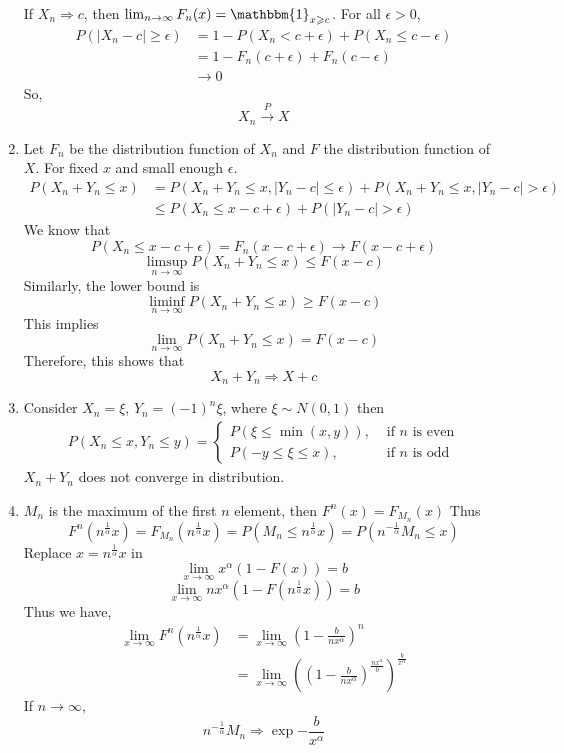 \documentclass{article}
\begin{document}
\begin{enumerate}
		If $X_n \Rightarrow c$, then $\lim_{n\to\infty}F_n(x) = \mathbbm{1}_{x \geqslant c}$. For all $\epsilon > 0$,\begin{align*}
			P(|X_n-c|\geqslant \epsilon)
			& = 1 - P(X_n < c+\epsilon) + P(X_n \leqslant c-\epsilon)\\
			& = 1 - F_n(c+\epsilon) + F_n(c -\epsilon)\\
			& \rightarrow 0
		\end{align*}
		So, $$X_n \overset{P}{\to} X$$

		\item Let $F_n$ be the distribution function of $X_n$ and $F$ the distribution function of $X$. For fixed $x$ and small enough $\epsilon$.
		\begin{align*}
			P(X_n + Y_n \leqslant x)
			& = P(X_n + Y_n \leqslant x, |Y_n -c|\leqslant \epsilon) + P(X_n + Y_n \leqslant x, |Y_n -c|>\epsilon)\\
			& \leqslant P(X_n \leqslant x-c+\epsilon) + P(|Y_n-c|>\epsilon)
		\end{align*}
		We know that $$P(X_n \leqslant x-c+\epsilon) = F_n(x-c+\epsilon) \to F(x-c+\epsilon)$$
		$$\limsup_{n\to\infty}P(X_n+Y_n\leqslant x) \leqslant F(x-c)$$
		Similarly, the lower bound is$$\liminf_{n\to\infty}P(X_n+Y_n\leqslant x) \geqslant F(x-c)$$
		This implies $$\lim_{n\to\infty}P(X_n+Y_n\leqslant x) = F(x-c)$$
		Therefore, this shows that $$X_n+Y_n \Rightarrow X + c$$

		\item Consider $X_n = \xi$, $Y_n = (-1)^n \xi$,  where $\xi \sim N(0,1)$ then\begin{align*}
			P(X_n\leqslant x, Y_n \leqslant y) = \left\{\begin{aligned}
				P(\xi \leqslant \min{(x,y)}), & \text{ if } n \text{ is even}\\
				P(-y \leqslant \xi \leqslant x), & \text{ if } n \text{ is odd}
			\end{aligned}\right.
		\end{align*}
		$X_n+Y_n$ does not converge in distribution.

		\item $M_n$ is the maximum of the first $n$ element, then $F^n(x) = F_{M_n}(x)$
		Thus $$F^n\left(n^{\frac{1}{\alpha}}x\right) = F_{M_n}\left(n^{\frac{1}{\alpha}}x\right) = P\left(M_n \leqslant n^{\frac{1}{\alpha}}x\right) = P\left(n^{-\frac{1}{\alpha}}M_n \leqslant x\right)$$
		Replace $x = n^{\frac{1}{\alpha}}x$ in
			$$\lim_{x\to\infty} x^{\alpha}(1-F(x))=b$$
			$$\lim_{x\to\infty} n x^{\alpha}\left(1-F\left(n^{\frac{1}{\alpha}}x\right)\right)=b$$
		Thus we have,\begin{align*}
			\lim_{x\to\infty} F^n\left(n^{\frac{1}{\alpha}}x\right)
			& = \lim_{x\to\infty} \left(1-\frac{b}{nx^\alpha}\right)^n\\
			& = \lim_{x\to\infty} \left(\left(1-\frac{b}{nx^\alpha}\right)^{\frac{nx^\alpha}{b}}\right)^{\frac{b}{x^\alpha}}
		\end{align*}
		If $n\to \infty$, $$n^{-\frac{1}{\alpha}}M_n \Rightarrow \exp{-\frac{b}{x^{\alpha}}}$$


\end{enumerate}
\end{document}

